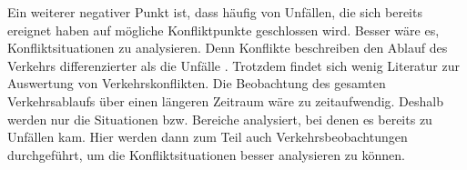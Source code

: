 Ein weiterer negativer Punkt ist, dass häufig von Unfällen, die sich bereits ereignet haben auf mögliche Konfliktpunkte geschlossen wird. Besser wäre es, Konfliktsituationen zu analysieren. Denn Konflikte beschreiben den Ablauf des Verkehrs differenzierter als die Unfälle \parencite[S. 13]{Erke.1978}. Trotzdem findet sich wenig Literatur zur Auswertung von Verkehrskonflikten. Die Beobachtung des gesamten Verkehrsablaufs über einen längeren Zeitraum wäre zu zeitaufwendig. Deshalb werden nur die Situationen bzw. Bereiche analysiert, bei denen es bereits zu Unfällen kam. Hier werden dann zum Teil auch Verkehrsbeobachtungen durchgeführt, um die Konfliktsituationen besser analysieren zu können.

